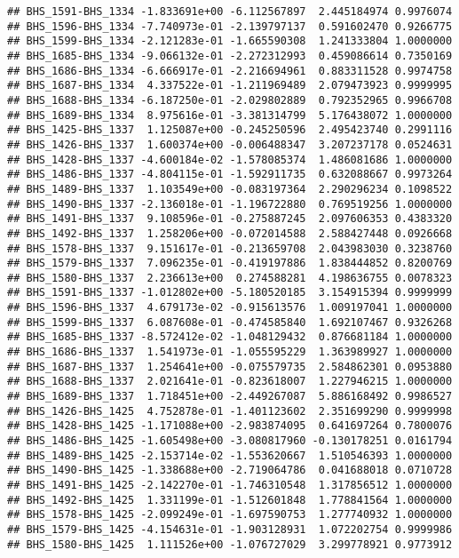 \documentclass[]{article}
\begin{document}
\begin{verbatim}
## BHS_1591-BHS_1334 -1.833691e+00 -6.112567897  2.445184974 0.9976074
## BHS_1596-BHS_1334 -7.740973e-01 -2.139797137  0.591602470 0.9266775
## BHS_1599-BHS_1334 -2.121283e-01 -1.665590308  1.241333804 1.0000000
## BHS_1685-BHS_1334 -9.066132e-01 -2.272312993  0.459086614 0.7350169
## BHS_1686-BHS_1334 -6.666917e-01 -2.216694961  0.883311528 0.9974758
## BHS_1687-BHS_1334  4.337522e-01 -1.211969489  2.079473923 0.9999995
## BHS_1688-BHS_1334 -6.187250e-01 -2.029802889  0.792352965 0.9966708
## BHS_1689-BHS_1334  8.975616e-01 -3.381314799  5.176438072 1.0000000
## BHS_1425-BHS_1337  1.125087e+00 -0.245250596  2.495423740 0.2991116
## BHS_1426-BHS_1337  1.600374e+00 -0.006488347  3.207237178 0.0524631
## BHS_1428-BHS_1337 -4.600184e-02 -1.578085374  1.486081686 1.0000000
## BHS_1486-BHS_1337 -4.804115e-01 -1.592911735  0.632088667 0.9973264
## BHS_1489-BHS_1337  1.103549e+00 -0.083197364  2.290296234 0.1098522
## BHS_1490-BHS_1337 -2.136018e-01 -1.196722880  0.769519256 1.0000000
## BHS_1491-BHS_1337  9.108596e-01 -0.275887245  2.097606353 0.4383320
## BHS_1492-BHS_1337  1.258206e+00 -0.072014588  2.588427448 0.0926668
## BHS_1578-BHS_1337  9.151617e-01 -0.213659708  2.043983030 0.3238760
## BHS_1579-BHS_1337  7.096235e-01 -0.419197886  1.838444852 0.8200769
## BHS_1580-BHS_1337  2.236613e+00  0.274588281  4.198636755 0.0078323
## BHS_1591-BHS_1337 -1.012802e+00 -5.180520185  3.154915394 0.9999999
## BHS_1596-BHS_1337  4.679173e-02 -0.915613576  1.009197041 1.0000000
## BHS_1599-BHS_1337  6.087608e-01 -0.474585840  1.692107467 0.9326268
## BHS_1685-BHS_1337 -8.572412e-02 -1.048129432  0.876681184 1.0000000
## BHS_1686-BHS_1337  1.541973e-01 -1.055595229  1.363989927 1.0000000
## BHS_1687-BHS_1337  1.254641e+00 -0.075579735  2.584862301 0.0953880
## BHS_1688-BHS_1337  2.021641e-01 -0.823618007  1.227946215 1.0000000
## BHS_1689-BHS_1337  1.718451e+00 -2.449267087  5.886168492 0.9986527
## BHS_1426-BHS_1425  4.752878e-01 -1.401123602  2.351699290 0.9999998
## BHS_1428-BHS_1425 -1.171088e+00 -2.983874095  0.641697264 0.7800076
## BHS_1486-BHS_1425 -1.605498e+00 -3.080817960 -0.130178251 0.0161794
## BHS_1489-BHS_1425 -2.153714e-02 -1.553620667  1.510546393 1.0000000
## BHS_1490-BHS_1425 -1.338688e+00 -2.719064786  0.041688018 0.0710728
## BHS_1491-BHS_1425 -2.142270e-01 -1.746310548  1.317856512 1.0000000
## BHS_1492-BHS_1425  1.331199e-01 -1.512601848  1.778841564 1.0000000
## BHS_1578-BHS_1425 -2.099249e-01 -1.697590753  1.277740932 1.0000000
## BHS_1579-BHS_1425 -4.154631e-01 -1.903128931  1.072202754 0.9999986
## BHS_1580-BHS_1425  1.111526e+00 -1.076727029  3.299778921 0.9773912

\end{verbatim}
\end{document}
